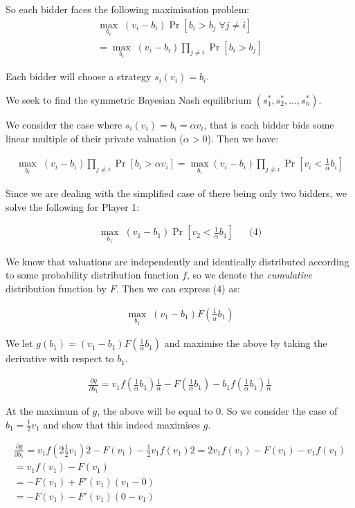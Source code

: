 \documentclass[11pt,a4paper]{article}
\begin{document}
So each bidder faces the following maximisation problem:
\begin{align*}
 \max_{b_i} \;(v_i-b_i) \Pr[b_i > b_j \; \forall j \neq i] \\
 = \max_{b_i}\; (v_i-b_i) \prod_{j \neq i} \Pr[b_i > b_j]
\end{align*}

Each bidder will choose a strategy $s_i(v_i) = b_i$.

We seek to find the symmetric Bayesian Nash equilibrium $(s_1^*, s_2^*, ..., s_n^*)$.

We consider the case where $s_i(v_i) = b_i = \alpha v_i$, that is each bidder bids some linear multiple of their private valuation ($\alpha > 0$). Then we have:

\begin{align*}
\max_{b_i}\; (v_i-b_i) \prod_{j \neq i} \Pr[b_i>\alpha v_i] = \max_{b_i} (v_i-b_i) \prod_{j \neq i} \Pr[v_i < \frac{1}{\alpha}b_i]
\end{align*}

Since we are dealing with the simplified case of there being only two bidders, we solve the following for Player 1:

\begin{align*}
\max_{b_1} \; (v_1-b_1) \Pr[v_2 < \frac{1}{\alpha} b_1] && \text{(4)}
\end{align*}

We know that valuations are independently and identically distributed according to some probability distribution function $f$, so we denote the \textit{cumulative} distribution function by $F$. Then we can express (4) as:

\begin{align*}
\max_{b_1}\; (v_1-b_1) F(\frac{1}{\alpha}b_1) 
\end{align*}

We let $g(b_1) = (v_1-b_1)F(\frac{1}{\alpha}b_1)$ and maximise the above by taking the derivative with respect to $b_1$.

\begin{align*}
\frac{\partial g}{\partial b_1} = v_1 f(\frac{1}{\alpha}b_1)\frac{1}{\alpha} - F(\frac{1}{\alpha}b_1) - b_1 f(\frac{1}{\alpha}b_1)\frac{1}{\alpha}
\end{align*}

At the maximum of $g$, the above will be equal to $0$. So we consider the case of $\hat{b}_1 = \frac{1}{2}v_1$ and show that this indeed maximises $g$.

\begin{align*}
\frac{\partial g}{\partial b_1} = v_1 f(2\frac{1}{2}v_1)2-F(v_1)-\frac{1}{2}v_1f(v_1)2 = 2v_1f(v_1)-F(v_1)-v_1f(v_1) \\
= v_1f(v_1)-F(v_1) \\
= -F(v_1) + F'(v_1)(v_1 - 0) \\
= -F(v_1) - F'(v_1)(0-v_1)
\end{align*}
\end{document}
